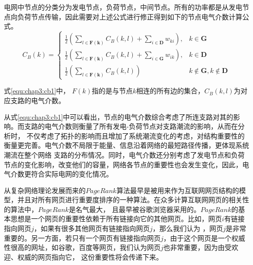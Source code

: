 电网中节点的分类分为发电节点，负荷节点，中间节点。所有的功率都是从发电节点向负荷节点传输，因此需要对上述公式进行修正得到如下的节点电气介数计算公式。
\begin{equation}
\label{equ:chap3:cb1}
C_{B}(k)=\left\{\begin{array}{ll}{\frac{1}{2}\left(\sum_{l \in \mathbf{F}(\mathbf{k})} C_{B}(k, l)+\sum_{i \in \mathbf{D}} w_{k i}\right),} & {k \in \mathbf{G}} \\ 
{\frac{1}{2}\left(\sum_{l \in \mathbf{F}(\mathbf{k})} C_{B}(k, l)+\sum_{i \in \mathbf{G}} w_{i k}\right),} & {k \in \mathbf{D}} \\
 {\frac{1}{2}\left(\sum_{l \in \mathbf{F}(\mathbf{k})} C_{B}(k, l)\right)} & {k \notin \mathbf{G}, k \notin \mathbf{D}}\end{array}\right.
\end{equation}

式\ref{equ:chap3:cb1}中，
$F(k)$指的是与节点$k$相连的所有边的集合，$C_B (k,l)$为对应支路的电气介数。


从式\ref{equ:chap3:cb1}中可以看出，节点的电气介数综合考虑了所连支路对其的影响。而支路的电气介数则衡量了所有发电-负荷节点对支路潮流的影响，从而在分析时，
不仅考虑了拓扑的影响而且增加了系统潮流变化的考虑，对结构重要性的衡量更完善。电气介数不局限于能量、信息沿着网络的最短路径传播，更体现系统潮流在整个网络
支路的分布情况。同时，电气介数还分别考虑了发电节点和负荷节点的变化影响，改变他们的容量，网络各节点的重要性也会发生变化，因此，电气介数更符合实际电网的变化情况。


从复杂网络理论发展而来的$PageRank$算法最早是被用来作为互联网网页结构的模型，并且对所有网页进行重要度排序的一种算法\cite{refs68,refs69}。在众多计算互联网网页的相关性的算法中，$PageRank$是名气最大，
且最早被谷歌浏览器采用的。$PageRank$的基本思想是一个网页的重要性依赖于所有链接向它的其他网页。比如，网页$i$有链接指向网页$j$，如果有很多其他网页有链接指向网页$j$，那么我们认为
，网页$j$是非常重要的。另一方面，若只有一个网页有链接指向网页$j$，由于这个网页是一个权威性很高的网址，如谷歌，百度等网页，我们认为网页$j$也非常重要，因为由受欢迎、权威的网页指向它，
这份重要性将会传递下来。

